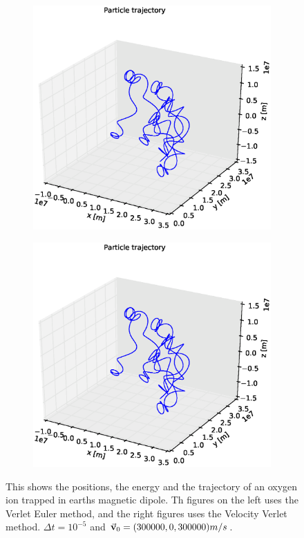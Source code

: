 \documentclass[x11names]{article}
\begin{document}
\begin{figure}
\begin{subfigure}{0.45\textwidth}
        \includegraphics[width = \textwidth]{../source/figures/ion_8_5_Euler3Dplot}
      \end{subfigure}
      \begin{subfigure}{0.45\textwidth}
        \includegraphics[width = \textwidth]{../source/figures/ion_8_5_Verlet3Dplot}
      \end{subfigure}
    \caption{This shows the positions, the energy and the trajectory of an oxygen ion trapped in earths magnetic dipole. Th figures on the left uses the Verlet Euler method, and the right figures uses the Velocity Verlet method. \(\Delta t = 10^{-5}\) and \(\va{v}_0 = (300000, 0 , 300000) m/s \).}
    \label{fig:high_vel}
    \end{figure}
\end{document}

